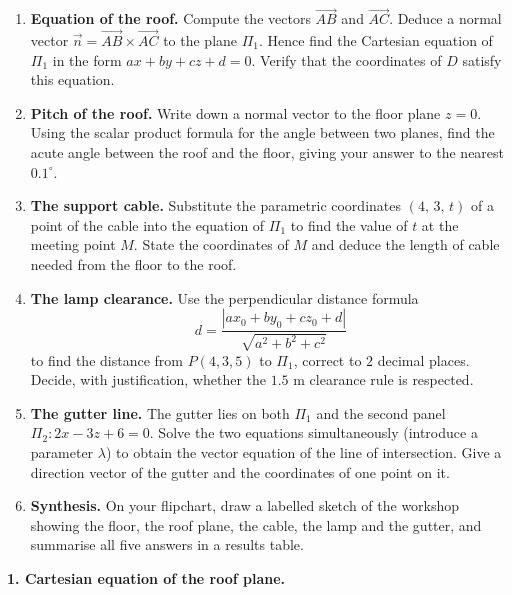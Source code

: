 \documentclass[11pt]{article}
\newcounter{popsec}
\newcounter{popsub}
\newcommand{\courssub}[1]{%
  \stepcounter{popsub}%
  \par\vspace{9pt}\noindent{\popxbold\fontsize{11.5}{13}\selectfont\color{popink}{\color{poporange}\thepopsec.\thepopsub}\hspace{6pt}#1}\par\nopagebreak\vspace{4pt}
}
\begin{document}
\begin{enumerate}
\item \textbf{Equation of the roof.} Compute the vectors $\overrightarrow{AB}$ and $\overrightarrow{AC}$. Deduce a normal vector $\vec{n} = \overrightarrow{AB} \times \overrightarrow{AC}$ to the plane $\Pi_1$. Hence find the Cartesian equation of $\Pi_1$ in the form $ax + by + cz + d = 0$. Verify that the coordinates of $D$ satisfy this equation.
\item \textbf{Pitch of the roof.} Write down a normal vector to the floor plane $z = 0$. Using the scalar product formula for the angle between two planes, find the acute angle between the roof and the floor, giving your answer to the nearest $0.1^\circ$.
\item \textbf{The support cable.} Substitute the parametric coordinates $(4,\, 3,\, t)$ of a point of the cable into the equation of $\Pi_1$ to find the value of $t$ at the meeting point $M$. State the coordinates of $M$ and deduce the length of cable needed from the floor to the roof.
\item \textbf{The lamp clearance.} Use the perpendicular distance formula
\[
d = \frac{|a x_0 + b y_0 + c z_0 + d|}{\sqrt{a^2 + b^2 + c^2}}
\]
to find the distance from $P(4,3,5)$ to $\Pi_1$, correct to $2$ decimal places. Decide, with justification, whether the $1.5$ m clearance rule is respected.
\item \textbf{The gutter line.} The gutter lies on both $\Pi_1$ and the second panel $\Pi_2 : 2x - 3z + 6 = 0$. Solve the two equations simultaneously (introduce a parameter $\lambda$) to obtain the vector equation of the line of intersection. Give a direction vector of the gutter and the coordinates of one point on it.
\item \textbf{Synthesis.} On your flipchart, draw a labelled sketch of the workshop showing the floor, the roof plane, the cable, the lamp and the gutter, and summarise all five answers in a results table.
\end{enumerate}

\courssub{Model Answer}

\textbf{1. Cartesian equation of the roof plane.}\par
\end{document}
